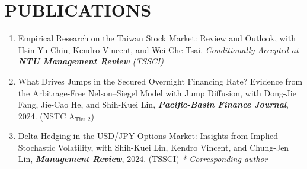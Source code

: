 \documentclass[12pt, letterpaper]{article}
\begin{document}
    \section{PUBLICATIONS}
    \begin{enumerate}
        \item Empirical Research on the Taiwan Stock Market: Review and Outlook, with Hsin Yu Chiu, Kendro Vincent, and Wei-Che Tsai. \textit{Conditionally Accepted at \textbf{NTU Management Review} (TSSCI)}
        \item What Drives Jumps in the Secured Overnight Financing Rate? Evidence from the Arbitrage-Free Nelson–Siegel Model with Jump Diffusion, with Dong-Jie Fang, Jie-Cao He, and Shih-Kuei Lin, \textit{\textbf{Pacific-Basin Finance Journal}}, 2024. (NSTC A$_\text{Tier 2}$)
        \item Delta Hedging in the USD/JPY Options Market: Insights from Implied Stochastic Volatility, with Shih-Kuei Lin, Kendro Vincent, and Chung-Jen Lin, \textit{\textbf{Management Review}}, 2024. (TSSCI) \textit{* Corresponding author}
    \end{enumerate}
\end{document}
